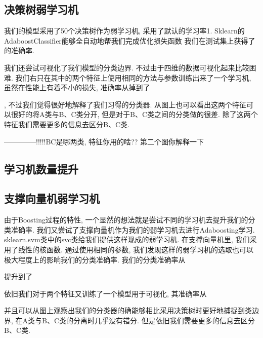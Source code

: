 \documentclass[lang=cn,11pt]{elegantpaper}
\begin{document}
\subsection{决策树弱学习机}

我们的模型采用了50个决策树作为弱学习机, 采用了默认的学习率1. Sklearn的AdaboostClassifier能够全自动地帮我们完成优化损失函数%
我们在测试集上获得了
的准确率. 


我们还尝试可视化了我们模型的分类边界. 不过由于四维的数据可视化起来比较困难. 我们右只在其中的两个特征上使用相同的方法与参数训练出来了一个学习机, 虽然在性能上有着不小的损失, 准确率从掉到了

, 不过我们觉得很好地解释了我们习得的分类器. 从图上也可以看出这两个特征可以很好的将A类与B、C类分开, 但是对于B、C类之间的分类做的很差. 除了这两个特征我们需要更多的信息去区分B、C类. 

--------------!!!!!BC是哪两类, 特征你用的啥?? 第二个图你解释一下


\subsection{学习机数量提升}


\subsection{支撑向量机弱学习机}

由于Boosting过程的特性, 一个显然的想法就是尝试不同的学习机去提升我们的分类准确率. 我们又尝试了支撑向量机作为我们的弱学习机去进行Adaboosting学习. sklearn.svm类中的svc类给我们提供这样现成的弱学习机. 在支撑向量机里, 我们采用了线性的核函数. 通过使用相同的参数, 我们发现这样的弱学习机的选取也可以极大程度上的影响我们的分类准确率. 我们的分类准确率从%

提升到了

依旧我们对于两个特征又训练了一个模型用于可视化, 其准确率从

并且可以从图上观察出我们的分类器的确能够相比采用决策树时更好地捕捉到类边界, 在A类与B、C类的分离时几乎没有错分. 但是依旧我们需要更多的信息去区分B、C类.



\newpage
\nocite{*}



\end{document}
